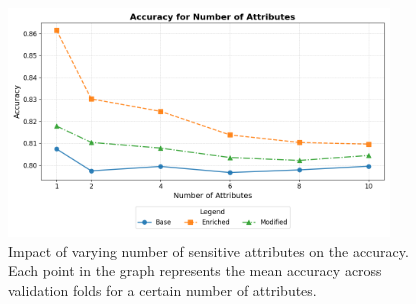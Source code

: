 \begin{figure}[h!]
    \centering
    \includegraphics[width=0.9\textwidth]{gfx/ablation_attributes_accuracy.png}
    \caption{Impact of varying number of sensitive attributes on the accuracy.
    Each point in the graph represents the mean accuracy across validation folds for a certain number of attributes.}

    \label{fig:ablation_attributes_accuracy}
\end{figure}

